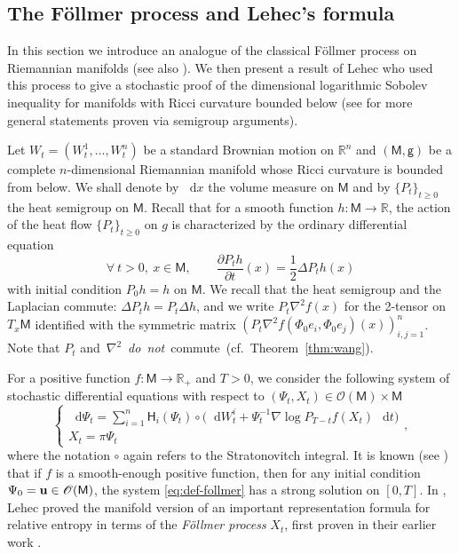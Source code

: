 \documentclass[a4paper,twoside,11pt,reqno]{amsart}
\newcommand*\diff{\mathop{}\!\mathrm{d}}
\newcommand{\R}{\mathbb{R}} %
\newcommand{\MM}{\mathsf{M}}
\newcommand{\GG}{\mathsf{g}}
\newcommand{\ms}{\mathscr}
\newcommand{\HH}{\mathsf{H}}
\begin{document}

\subsection{The F\"ollmer process and Lehec's formula} In this section we introduce an analogue of the classical F\"ollmer process \cite{Sch32,Fol86,Leo14} on Riemannian manifolds (see also \cite[Section~5.4]{Hsu02}). We then present a result of Lehec \cite{Leh17} who used this process to give a stochastic proof of the dimensional logarithmic Sobolev inequality for manifolds with Ricci curvature bounded below (see \cite{BL06,BBL17} for more general statements proven via semigroup arguments). 

Let $W_t=(W_t^1,\ldots,W_t^n)$ be a standard Brownian motion on $\R^n$ and $(\MM, \GG)$ be a complete $n$-dimensional Riemannian manifold whose Ricci curvature is bounded from below. We shall denote by $\diff x$ the volume measure on $\MM$ and by $\{P_t\}_{t\geq0}$ the heat semigroup on $\MM$. Recall that for a smooth function $h:\MM\to\R$, the action of the heat flow $\{P_t\}_{t\geq0}$ on $g$ is characterized by the ordinary differential equation
\begin{equation}
\forall \ t>0, \ x\in\MM,\qquad \frac{\partial P_th}{\partial t}(x) = \frac{1}{2}\Delta P_t h(x)
\end{equation}
with initial condition $P_0h = h$ on $\MM$. We recall that the heat semigroup and the Laplacian commute: $ \Delta P_th=P_t\Delta h$, and we write $P_t\nabla^2 f(x)$ for the 2-tensor on $T_x\MM$ identified with the symmetric matrix $( P_t\nabla^2 f(\Phi_0e_i, \Phi_0e_j)(x))_{i,j=1}^n$. Note that $P_t$ and\mbox{ $\nabla^2$ \emph{do not} commute (cf. Theorem \ref{thm:wang}).}

For a positive function $f:\MM\to\R_+$ and $T>0$, we consider the following system of stochastic differential equations with respect to $(\Psi_t, X_t) \in \ms{O}(\MM)\times\MM$
\begin{equation} \label{eq:def-follmer}
\begin{cases}
\diff\Psi_t = \sum_{i=1}^n \HH_i (\Psi_t) \circ \big( \diff W_t^i + \Psi_t^{-1} \nabla\log P_{T-t}f(X_t) \, \diff t\big)\\
X_t = \pi\Psi_t
\end{cases},
\end{equation}
where the notation $\circ$ again refers to the Stratonovitch integral. It is known (see \cite[Theorem~7]{Leh17}) that if $f$ is a smooth-enough positive function, then for any initial condition $\Psi_0 = {\bf u}\in\ms{O}(\MM)$, the system \eqref{eq:def-follmer} has a strong solution on $[0,T]$. In \cite[Theorem~7]{Leh17}, Lehec proved the  manifold version of an important representation formula for relative entropy in terms of the {\it F\"ollmer process} $X_t$, first proven in their earlier work \cite{Leh13}.
\end{document}
